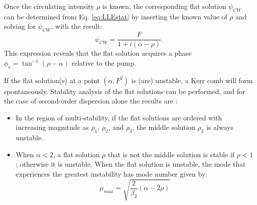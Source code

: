 	
	

Once the circulating intensity $\rho$ is known, the corresponding flat solution $\psi_{CW}$ can be determined from Eq. \ref{eq:LLEstat} by inserting the known value of $\rho$ and solving for $\psi_{CW}$, with the result:
\begin{equation}
\psi_{CW}=\frac{F}{1+i(\alpha-\rho)}.\label{eq:LLEflatsoln}
\end{equation}
This expression reveals that the flat solution acquires a phase $\phi_s=\tan^{-1}(\rho-\alpha)$ relative to the pump.



If the flat solution(s) at a point $(\alpha,F^2)$ is (are) unstable, a Kerr comb will form spontaneously. Stability analysis of the flat solutions can be performed, and for the case of second-order dispersion alone the results are \cite{Godey2014}:
\begin{itemize}
	\item In the region of multi-stability, if the flat solutions are ordered with increasing magnitude as $\rho_1$, $\rho_2$, and $\rho_3$, the middle solution $\rho_2$ is always unstable. 
	\item When $\alpha<2$, a flat solution $\rho$ that is not the middle solution is stable if $\rho<1$; otherwise it is unstable. When the flat solution is unstable, the mode that experiences the greatest instability has mode number given by:
	\begin{equation}
\mu_{max}=\sqrt{\frac{2}{\beta_2}(\alpha-2\rho)}  \label{eq:mumax}
	\end{equation} 
\end{itemize}

